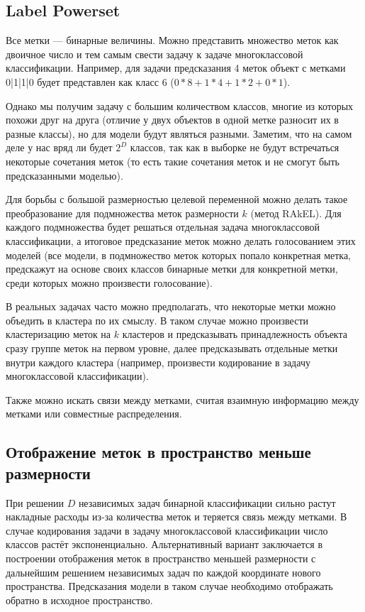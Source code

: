 \documentclass[12pt,fleqn]{article}
\begin{document}
\subsection{Label Powerset}

Все метки --- бинарные величины. Можно представить множество меток как двоичное число и тем самым свести задачу к задаче многоклассовой классификации. Например, для задачи предсказания 4 меток объект с метками 0|1|1|0 будет представлен как класс 6 ($0 * 8 + 1 * 4 + 1 * 2 + 0 * 1$).

Однако мы получим задачу с большим количеством классов, многие из которых похожи друг на друга (отличие у двух объектов в одной метке разносит их в разные классы), но для модели будут являться разными. Заметим, что на самом деле у нас вряд ли будет $2^D$ классов, так как в выборке не будут встречаться некоторые сочетания меток (то есть такие сочетания меток и не смогут быть предсказанными моделью).

Для борьбы с большой размерностью целевой переменной можно делать такое преобразование для подмножества меток размерности $k$ (метод RAkEL). Для каждого подмножества будет решаться отдельная задача многоклассовой классификации, а итоговое предсказание меток можно делать голосованием этих моделей (все модели, в подмножество меток которых попало конкретная метка, предскажут на основе своих классов бинарные метки для конкретной метки, среди которых можно произвести голосование).

В реальных задачах часто можно предполагать, что некоторые метки можно объедить в кластера по их смыслу. В таком случае можно произвести кластеризацию меток на $k$ кластеров и предсказывать принадлежность объекта сразу группе меток на первом уровне, далее предсказывать отдельные метки внутри каждого кластера (например, произвести кодирование в задачу многоклассовой классификации).

Также можно искать связи между метками, считая взаимную информацию между метками или совместные распределения.

\subsection{Отображение меток в пространство меньше размерности}

При решении $D$ независимых задач бинарной классификации сильно растут накладные расходы из-за количества меток и теряется связь между метками. В случае кодирования задачи в задачу многоклассовой классификации число классов растёт экспоненциально. Альтернативный вариант заключается в построении отображения меток в пространство меньшей размерности с дальнейшим решением независимых задач по каждой координате нового пространства. Предсказания модели в таком случае необходимо отображать обратно в исходное пространство.
\end{document}
